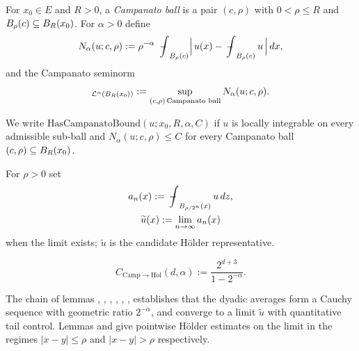 \begin{definition}
\label{def:CampanatoBall}
\leanok
For $x_0 \in E$ and $R > 0$, a \emph{Campanato ball} is a pair $(c,\rho)$ with
$0 < \rho \le R$ and $B_{\rho}(c) \subseteq B_{R}(x_0)$. For $\alpha > 0$ define
\begin{equation*}
N_{\alpha}(u; c,\rho)
:= \rho^{-\alpha}\, \fint_{\Ball{\rho}{c}}
\Bigl|\, u(x) - \fint_{\Ball{\rho}{c}} u\, \Bigr|\, dx,
\end{equation*}
and the Campanato seminorm
\begin{equation*}
[u]_{\mathcal{L}^{\alpha}(\Ball{R}{x_0})}
:= \sup_{(c,\rho)\,\text{Campanato ball}} N_{\alpha}(u;c,\rho).
\end{equation*}
\end{definition}

\begin{definition}
\label{def:HasCampanatoBound}
\leanok
{}
We write $\mathrm{HasCampanatoBound}(u; x_0, R, \alpha, C)$ if $u$ is locally integrable on every
admissible sub-ball and $N_{\alpha}(u; c, \rho) \le C$ for every Campanato ball
$(c,\rho) \subseteq B_{R}(x_0)$.
\end{definition}

\begin{definition}
\label{def:dyadicBallAverage}
\leanok
For $\rho > 0$ set
\begin{gather*}
a_n(x) := \fint_{\Ball{\rho/2^{n}}{x}} u\, dz, \\
\widetilde u(x) := \lim_{n\to\infty} a_n(x)
\end{gather*}
when the limit exists; $\widetilde u$ is the candidate H\"older representative.
\end{definition}

\begin{definition}
\label{def:C_campanato_holder}
\leanok
\begin{equation*}
C_{\mathrm{Camp\to H\ddot ol}}(d,\alpha) := \frac{2^{d+3}}{1 - 2^{-\alpha}}.
\end{equation*}
\end{definition}

The chain of lemmas
,
,
,
,
,
,
establishes that the dyadic averages form a
Cauchy sequence with geometric ratio $2^{-\alpha}$, and converge to a limit
$\widetilde u$ with quantitative tail control. Lemmas
 and
give pointwise H\"older estimates on the
limit in the regimes $|x-y| \le \rho$ and $|x-y| > \rho$ respectively.

